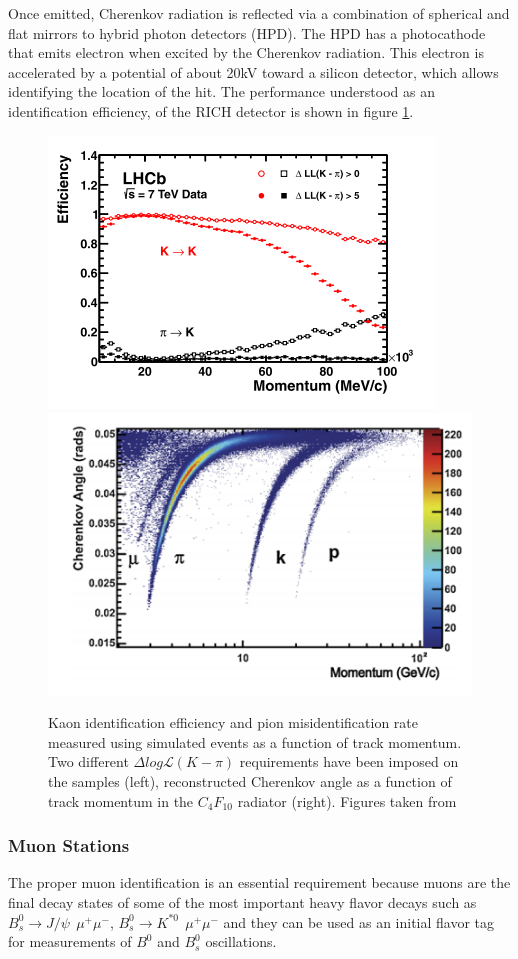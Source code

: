 Once emitted, Cherenkov radiation is reflected via a combination of spherical and flat mirrors to hybrid photon detectors (HPD). The HPD has a photocathode that emits electron when excited by the Cherenkov radiation. This electron is accelerated by a potential of about 20kV toward a silicon detector, which allows identifying the location of the hit. The performance understood as an identification efficiency, of the RICH detector is shown in figure \ref{fig:RICH_performance}. 


\begin{figure}[h]
 \begin{center}
  \includegraphics[width=0.49\linewidth]{figures/Kaon_proton.PNG}
   \includegraphics[width=0.49\linewidth]{figures/Chernkov_angle.PNG}
    \caption{Kaon identification efficiency and pion misidentification rate measured using simulated events as a function of track momentum. Two different $\Delta log \mathcal{L}(K − \pi)$ requirements have been imposed on the
samples (left), reconstructed Cherenkov angle as a function of track momentum in the $C_4F_{10}$ radiator (right). Figures taken from \cite{RICH_performance}}%
    \label{fig:RICH_performance}%
 \end{center}
\end{figure}


\subsubsection{Muon Stations}

The proper muon identification is an essential requirement because muons are the final decay states of some of the most important heavy flavor decays such as $B_s^0 \rightarrow J/\psi ~~ \mu^{+}\mu^{-}$,  $B^{0}_s \rightarrow K^{*0} ~~ \mu^{+}\mu^{-}$ and they can be used as an initial flavor tag for measurements of $B^0$  and $B^0_{s}$ oscillations. 

